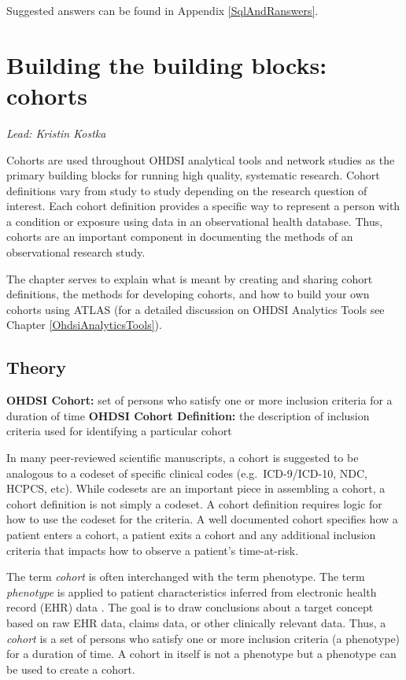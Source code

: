 \documentclass[11pt]{book}
\theoremstyle{definition}
\theoremstyle{definition}
\theoremstyle{definition}
\theoremstyle{remark}
\let\BeginKnitrBlock\begin \let\EndKnitrBlock\end
\begin{document}
Suggested answers can be found in Appendix \ref{SqlAndRanswers}.

\hypertarget{Cohorts}{%
\chapter{Building the building blocks: cohorts}\label{Cohorts}}

\emph{Lead: Kristin Kostka}

Cohorts are used throughout OHDSI analytical tools and network studies as the primary building blocks for running high quality, systematic research. Cohort definitions vary from study to study depending on the research question of interest. Each cohort definition provides a specific way to represent a person with a condition or exposure using data in an observational health database. Thus, cohorts are an important component in documenting the methods of an observational research study.

The chapter serves to explain what is meant by creating and sharing cohort definitions, the methods for developing cohorts, and how to build your own cohorts using ATLAS (for a detailed discussion on OHDSI Analytics Tools see Chapter \ref{OhdsiAnalyticsTools}).

\hypertarget{theory}{%
\section{Theory}\label{theory}}

\BeginKnitrBlock{rmdimportant}
\textbf{OHDSI Cohort:} set of persons who satisfy one or more inclusion criteria for a duration of time
\textbf{OHDSI Cohort Definition:} the description of inclusion criteria used for identifying a particular cohort
\EndKnitrBlock{rmdimportant}

In many peer-reviewed scientific manuscripts, a cohort is suggested to be analogous to a codeset of specific clinical codes (e.g.~ICD-9/ICD-10, NDC, HCPCS, etc). While codesets are an important piece in assembling a cohort, a cohort definition is not simply a codeset. A cohort definition requires logic for how to use the codeset for the criteria. A well documented cohort specifies how a patient enters a cohort, a patient exits a cohort and any additional inclusion criteria that impacts how to observe a patient's time-at-risk.

\BeginKnitrBlock{rmdimportant}
The term \emph{cohort} is often interchanged with the term phenotype. The term \emph{phenotype} is applied to patient characteristics inferred from electronic health record (EHR) data \citep{Hripcsak7329}. The goal is to draw conclusions about a target concept based on raw EHR data, claims data, or other clinically relevant data. Thus, a \emph{cohort} is a set of persons who satisfy one or more inclusion criteria (a phenotype) for a duration of time. A cohort in itself is not a phenotype but a phenotype can be used to create a cohort.
\EndKnitrBlock{rmdimportant}
\end{document}
